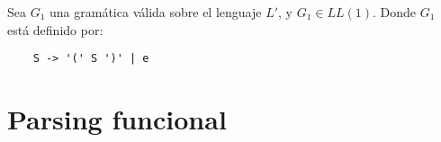 \begin{exmp}
	Sea $G_1$ una gramática válida sobre el lenguaje $L'$, y $G_1 \in LL(1)$.
	Donde $G_1$ está definido por:
	
	\begin{lstlisting}
	S -> '(' S ')' | e
	\end{lstlisting}
	

	
\end{exmp}

	
\section{Parsing funcional}




